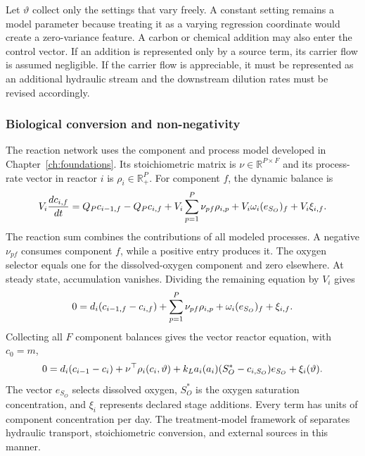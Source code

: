 Let $\vartheta$ collect only the settings that vary freely. A constant setting remains a model parameter because treating it as a varying regression coordinate would create a zero-variance feature. A carbon or chemical addition may also enter the control vector. If an addition is represented only by a source term, its carrier flow is assumed negligible. If the carrier flow is appreciable, it must be represented as an additional hydraulic stream and the downstream dilution rates must be revised accordingly.

\subsubsection{Biological conversion and non-negativity}

The reaction network uses the component and process model developed in Chapter~\ref{ch:foundations}. Its stoichiometric matrix is $\nu\in\mathbb R^{P\times F}$ and its process-rate vector in reactor $i$ is $\rho_i\in\mathbb R_+^P$. For component $f$, the dynamic balance is
\begin{equation}
\equationname{Dynamic reactor-stage equation for one component}
V_i\frac{dc_{i,f}}{dt}=Q_Pc_{i-1,f}-Q_Pc_{i,f}
+V_i\sum_{p=1}^{P}\nu_{pf}\rho_{i,p}+V_i\omega_i(e_{S_O})_f+V_i\xi_{i,f}.
\end{equation}
The reaction sum combines the contributions of all modeled processes. A negative $\nu_{pf}$ consumes component $f$, while a positive entry produces it. The oxygen selector equals one for the dissolved-oxygen component and zero elsewhere. At steady state, accumulation vanishes. Dividing the remaining equation by $V_i$ gives
\begin{equation}
\equationname{Steady-state reactor-stage equation for one component}
0=d_i(c_{i-1,f}-c_{i,f})+\sum_{p=1}^{P}\nu_{pf}\rho_{i,p}
+\omega_i(e_{S_O})_f+\xi_{i,f}.
\end{equation}
Collecting all $F$ component balances gives the vector reactor equation, with $c_0=m$,
\begin{equation}
\equationname{Vector reactor-stage equation with aeration and external additions}
0=d_i(c_{i-1}-c_i)+\nu^\top\rho_i(c_i,\vartheta)
+k_La_i(a_i)(S_O^*-c_{i,S_O})e_{S_O}+\xi_i(\vartheta).
\label{eq:plant_reactor}
\end{equation}
The vector $e_{S_O}$ selects dissolved oxygen, $S_O^*$ is the oxygen saturation concentration, and $\xi_i$ represents declared stage additions. Every term has units of component concentration per day. The treatment-model framework of \citet{Henze2006} separates hydraulic transport, stoichiometric conversion, and external sources in this manner.

